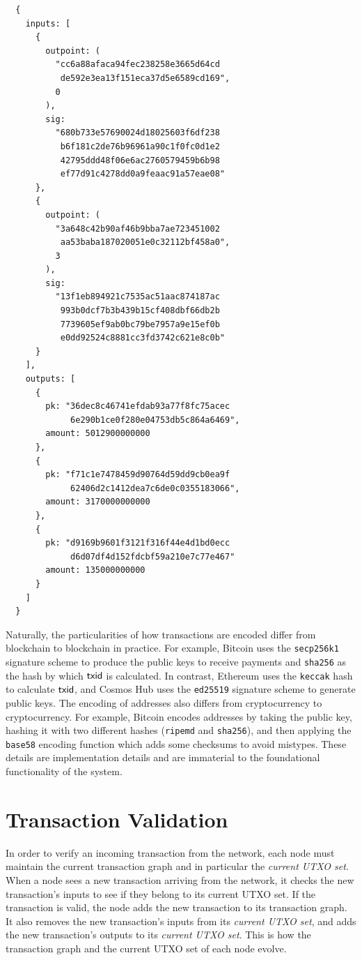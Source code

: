 \begin{Verbatim}
  {
    inputs: [
      {
        outpoint: (
          "cc6a88afaca94fec238258e3665d64cd
           de592e3ea13f151eca37d5e6589cd169",
          0
        ),
        sig:
          "680b733e57690024d18025603f6df238
           b6f181c2de76b96961a90c1f0fc0d1e2
           42795ddd48f06e6ac2760579459b6b98
           ef77d91c4278dd0a9feaac91a57eae08"
      },
      {
        outpoint: (
          "3a648c42b90af46b9bba7ae723451002
           aa53baba187020051e0c32112bf458a0",
          3
        ),
        sig:
          "13f1eb894921c7535ac51aac874187ac
           993b0dcf7b3b439b15cf408dbf66db2b
           7739605ef9ab0bc79be7957a9e15ef0b
           e0dd92524c8881cc3fd3742c621e8c0b"
      }
    ],
    outputs: [
      {
        pk: "36dec8c46741efdab93a77f8fc75acec
             6e290b1ce0f280e04753db5c864a6469",
        amount: 5012900000000
      },
      {
        pk: "f71c1e7478459d90764d59dd9cb0ea9f
             62406d2c1412dea7c6de0c0355183066",
        amount: 3170000000000
      },
      {
        pk: "d9169b9601f3121f316f44e4d1bd0ecc
             d6d07df4d152fdcbf59a210e7c77e467"
        amount: 135000000000
      }
    ]
  }
\end{Verbatim}

Naturally, the particularities of how transactions are encoded differ from blockchain
to blockchain in practice. For example, Bitcoin uses the \texttt{secp256k1} signature
scheme to produce the public keys to receive payments and
\texttt{sha256} as the hash by which $\mathsf{txid}$ is calculated.
In contrast, Ethereum uses the \texttt{keccak} hash to calculate $\mathsf{txid}$,
and Cosmos Hub uses the \texttt{ed25519} signature scheme to generate public keys.
The encoding of addresses also differs from cryptocurrency to cryptocurrency.
For example, Bitcoin encodes addresses by taking the public key,
hashing it with two different hashes (\texttt{ripemd} and \texttt{sha256}),
and then applying the \texttt{base58}
encoding function which adds some checksums to avoid mistypes.
These details are implementation details and are immaterial to the foundational
functionality of the system.

\section{Transaction Validation}

In order to verify an incoming transaction from the network, each node must maintain the current transaction
graph and in particular the \emph{current UTXO set}.
When a node sees a new transaction arriving from
the network, it checks the new transaction's inputs to see if they belong to its current UTXO set.
If the transaction is valid, the node adds the new transaction to its transaction graph.
It also removes the new transaction's inputs
from its \emph{current UTXO set}, and adds the new transaction's outputs to its \emph{current UTXO set}.
This is how the transaction graph and the current UTXO set of each node evolve.

